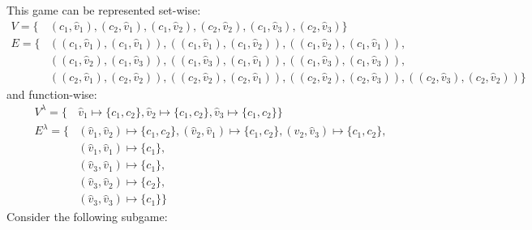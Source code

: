 \begin{example}
\begin{center}
	\end{center}
	This game can be represented set-wise:
	\begin{align*}
	V = \{&(c_1,\hat{v}_1),(c_2,\hat{v}_1),(c_1,\hat{v}_2),(c_2,\hat{v}_2),(c_1,\hat{v}_3),(c_2,\hat{v}_3) \}\\
	E = \{& ((c_1,\hat{v}_1),(c_1,\hat{v}_1)),((c_1,\hat{v}_1),(c_1,\hat{v}_2)),((c_1,\hat{v}_2),(c_1,\hat{v}_1)),\\
	&((c_1,\hat{v}_2),(c_1,\hat{v}_3)),((c_1,\hat{v}_3),(c_1,\hat{v}_1)),((c_1,\hat{v}_3),(c_1,\hat{v}_3)), \\
	&((c_2,\hat{v}_1),(c_2,\hat{v}_2)),((c_2,\hat{v}_2),(c_2,\hat{v}_1)),((c_2,\hat{v}_2),(c_2,\hat{v}_3)),((c_2,\hat{v}_3),(c_2,\hat{v}_2))\}
	\end{align*}
	and function-wise:
	\begin{align*}
	V^\lambda = \{&\hat{v}_1 \mapsto \{c_1,c_2\},\hat{v}_2 \mapsto \{c_1,c_2\},\hat{v}_3 \mapsto \{c_1,c_2\}\}\\
	E^\lambda = \{&(\hat{v}_1,\hat{v}_2) \mapsto \{c_1,c_2\},(\hat{v}_2,\hat{v}_1) \mapsto \{c_1,c_2\},(\hat{v}_2,\hat{v}_3) \mapsto \{c_1,c_2\},\\
	&(\hat{v}_1,\hat{v}_1) \mapsto \{c_1\},\\
	&(\hat{v}_3,\hat{v}_1) \mapsto \{c_1\},\\
	&(\hat{v}_3,\hat{v}_2) \mapsto \{c_2\},\\
	&(\hat{v}_3,\hat{v}_3) \mapsto \{c_1\}\}
	\end{align*}
	Consider the following subgame:
	\begin{center}
\end{center}
\end{example}
